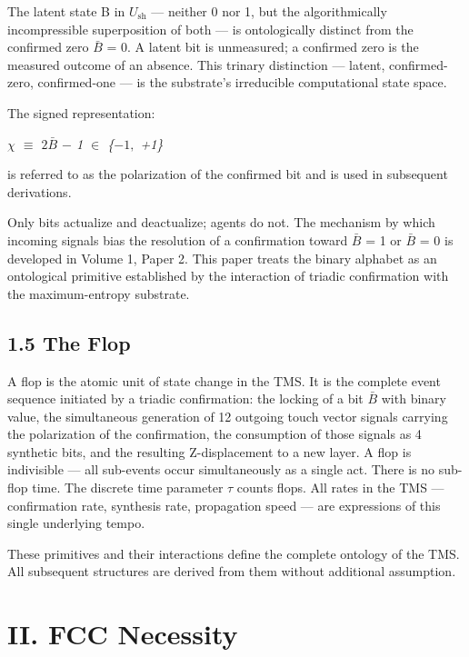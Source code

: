 \documentclass[11pt,oneside]{report}
\theoremstyle{definition}
\theoremstyle{remark}
\begin{document}
The latent state B in \ensuremath{U_{\mathrm{sh}}} --- neither 0 nor 1, but the algorithmically
incompressible superposition of both --- is ontologically distinct from
the confirmed zero \ensuremath{\bar{B}} = 0. A latent bit is unmeasured; a confirmed zero
is the measured outcome of an absence. This trinary distinction ---
latent, confirmed-zero, confirmed-one --- is the substrate's irreducible
computational state space.

The signed representation:

\emph{\ensuremath{\chi} \ensuremath{\equiv} \ensuremath{2\bar{B}} \ensuremath{-} 1 \ensuremath{\in} \{\ensuremath{-1,} +1\}}

is referred to as the polarization of the confirmed bit and is used in
subsequent derivations.

Only bits actualize and deactualize; agents do not. The mechanism by
which incoming signals bias the resolution of a confirmation toward \ensuremath{\bar{B}} =
1 or \ensuremath{\bar{B}} = 0 is developed in Volume 1, Paper 2. This paper treats the
binary alphabet as an ontological primitive established by the
interaction of triadic confirmation with the maximum-entropy substrate.

\subsection*{1.5 The Flop}

A flop is the atomic unit of state change in the TMS. It is the complete
event sequence initiated by a triadic confirmation: the locking of a bit
\ensuremath{\bar{B}} with binary value, the simultaneous generation of 12 outgoing touch
vector signals carrying the polarization of the confirmation, the
consumption of those signals as 4 synthetic bits, and the resulting
Z-displacement to a new layer. A flop is indivisible --- all sub-events
occur simultaneously as a single act. There is no sub-flop time. The
discrete time parameter \ensuremath{\tau} counts flops. All rates in the TMS ---
confirmation rate, synthesis rate, propagation speed --- are expressions
of this single underlying tempo.

These primitives and their interactions define the complete ontology of
the TMS. All subsequent structures are derived from them without
additional assumption.

\section*{II. FCC Necessity}
\end{document}
